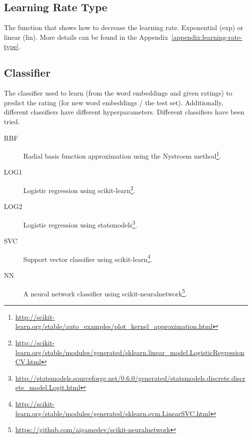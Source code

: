 \subsection{Learning Rate Type}

The function that shows how to decrease the learning rate. Exponential (exp) or linear (lin). More details can be found in the Appendix~\ref{appendix:learning-rate-type}.

\subsection{Classifier}

The classifier used to learn (from the word embeddings and given ratings) to predict the rating (for new word embeddings / the test set). Additionally, different classifiers have different hyperparameters. Different classifiers have been tried. 

\begin{description}
	\item[RBF] Radial basis function approximation using the Nystroem method\footnote{\url{http://scikit-learn.org/stable/auto_examples/plot_kernel_approximation.html}}.
	\item[LOG1] Logistic regression using scikit-learn\footnote{\url{http://scikit-learn.org/stable/modules/generated/sklearn.linear_model.LogisticRegressionCV.html}}.
	\item[LOG2] Logistic regression using statsmodels\footnote{\url{http://statsmodels.sourceforge.net/0.6.0/generated/statsmodels.discrete.discrete_model.Logit.html}}.
	\item[SVC] Support vector classifier using scikit-learn\footnote{\url{http://scikit-learn.org/stable/modules/generated/sklearn.svm.LinearSVC.html}}.
	\item[NN] A neural network classifier using scikit-neuralnetwork\footnote{\url{https://github.com/aigamedev/scikit-neuralnetwork}}.
\end{description}

